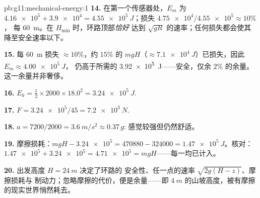 \begin{solution}{pb:g11:mechanical-energy:1}
\textbf{14.} 在第一个传感器处，$E_m$ 为 $\num{4.16e5} + \num{3.9e4} =
\qty{4.55e5}{J}$；损失 $\num{4.75e4}/\num{4.55e5} \approx 10\%$，
每 \qty{60}{m}。在 $H_{\min}$ 时，环路顶部\emph{恰好}
达到 $\sqrt{gR}$ 的速率；任何损失都会使其降至安全速率以下。

\textbf{15.} 每 \qty{60}{m} 损失 $\approx 10\%$，约 $15\%$ 的
$mgH$（$\approx \qty{7.1e4}{J}$）已损失，因此 $E_m \approx \qty{4.00e5}{J}$，
仍高于所需的 \qty{3.92e5}{J}——安全，仅余 $2\%$
的余量。这一余量并非奢侈。

\textbf{16.} $E_k = \tfrac12 \times 2000 \times 18.0^2 =
\qty{3.24e5}{J}$.

\textbf{17.} $F = \num{3.24e5}/45 = \qty{7.2e3}{N}$.

\textbf{18.} $a = 7200/2000 = \qty{3.6}{m/s^2} \approx 0.37\,g$:
感觉较强但仍然舒适。

\textbf{19.} 摩擦损耗：$mgH - \num{3.24e5} = \num{470880} -
\num{324000} = \qty{1.47e5}{J}$。核对：$\num{1.47e5} + \num{3.24e5} =
\num{4.71e5} = mgH$——每一均已计入。

\textbf{20.} 出发高度 $H = \qty{24}{m}$ 决定了环路的
安全性、任一点的速率 $\sqrt{2g(H - z)}$、摩擦损耗与
制动力；忽略摩擦的代价，便是余量——即 $\qty{4}{m}$
的山坡高度，被有摩擦的现实世界悄然耗去。
\end{solution}
